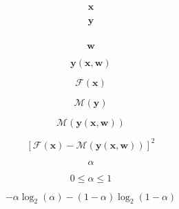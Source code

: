 \documentclass[10pt,twoside]{book}
\newcommand{\fat}[1]{\mathbf{#1}} %
\begin{document}
$$
\fat{x}
$$

$$
\fat{y}
$$

$$
$$

$$
\fat{w}
$$

$$
\fat{y}( \fat{x}, \fat{w} )
$$

$$
\mathcal{F}( \fat{x} )
$$

$$
\mathcal{M}( \fat{y} )
$$

$$
\mathcal{M}( \fat{y}( \fat{x}, \fat{w} ) )
$$


$$
\left[ 
\mathcal{F}( \fat{x} ) - \mathcal{M}( \fat{y}( \fat{x}, \fat{w} ) )
\right]^2
$$



$$
\alpha
$$

$$
0 \leq
\alpha
\leq 1
$$

$$
-\alpha \log_2( \alpha ) - (1-\alpha) \log_2( 1-\alpha )
$$
\end{document}
